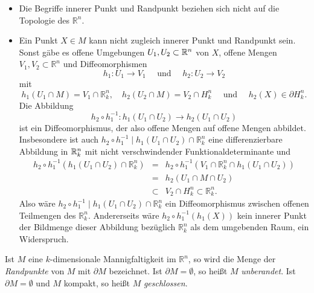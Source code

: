\documentclass[a4paper,twoside,DIV15,BCOR12mm]{scrbook}
\begin{document}
\bigskip

\begin{itemize}
\item Die Begriffe innerer Punkt und Randpunkt 
beziehen sich nicht auf die Topologie des ${\mathbb R}^{n}$. 
\item Ein Punkt $X 
\in M$ kann nicht zugleich innerer Punkt und Randpunkt sein. Sonst 
gäbe es offene Umgebungen $U_{1}, U_{2}\subset\mathbb{R}^n$ von $X$,  offene Mengen
 $V_{1}, V_{2} \subset {\mathbb 
R}^{n}$ und Diffeomorphismen
\[ h_{1} : U_{1} \to V_{1} \quad \mbox{ und } \quad h_{2}: U_{2} \to 
V_{2} \]
mit
\[ h_{1}(U_{1} \cap M) = V_{1} \cap {\mathbb R}_{k}^{n}, \quad 
 h_{2}(U_{2} \cap M) = V_{2} \cap H_{k}^{n} \quad \mbox{ 
und }\quad h_2(X)\in\partial H^n_k.\]
Die Abbildung
\[ h_{2} \circ h_{1}^{-1}: h_{1} (U_{1} \cap U_{2}) \to h_{2}(U_{1} 
\cap U_{2}) \]
ist ein Diffeomorphismus, der also offene Mengen auf offene Mengen 
abbildet. Insbesondere ist auch $h_{2} \circ h_{1}^{-1} \mid 
h_{1}(U_{1} \cap U_{2}) \cap {\mathbb R}_{k}^{n}$ eine 
differenzierbare Abbildung in $\mathbb{R}^n_k$ mit nicht verschwindender 
Funktionaldeterminante und 
\begin{eqnarray*}
h_{2} \circ h_{1}^{-1}(h_{1}(U_{1} \cap U_{2}) \cap {\mathbb 
R}_{k}^{n}) & = & h_{2} \circ h_{1}^{-1}(V_{1} \cap {\mathbb 
R}_{k}^{n} \cap h_{1}(U_{1} \cap U_{2})) \\
& = & h_{2}(U_{1} \cap M \cap U_{2}) \\
& \subset & V_{2} \cap H_{k}^{n} \subset {\mathbb R}_{k}^{n}.
\end{eqnarray*}
Also wäre $h_{2} \circ h_{1}^{-1} \mid h_{1}(U_{1} \cap U_{2}) 
\cap {\mathbb R}_{k}^{n}$ ein Diffeomorphismus zwischen offenen 
Teilmengen des ${\mathbb R}_{k}^{n}$. Andererseits wäre $h_{2} \circ 
h_{1}^{-1}(h_{1}(X))$ kein innerer Punkt 
 der Bildmenge dieser Abbildung bezüglich ${\mathbb 
R}_{k}^{n}$ als dem umgebenden Raum, ein Widerspruch.
\end{itemize}

\bigskip

 Ist $M$ eine $k$-dimensionale 
Mannigfaltigkeit im ${\mathbb R}^{n}$, so wird die Menge der 
{\em Randpunkte} von $M$ mit $\partial M$ bezeichnet. Ist $\partial M = 
\emptyset$, so heißt $M$ {\em unberandet}. Ist $\partial M = \emptyset$ 
und $M$ kompakt, so heißt $M$ {\em geschlossen}.

\bigskip
\end{document}
